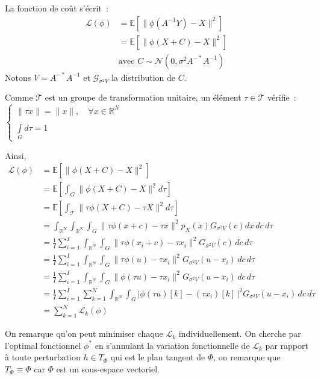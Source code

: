 \documentclass[a4paper,10pt]{article}
\theoremstyle{definition} %
\theoremstyle{definition} %
\theoremstyle{definition} %
\theoremstyle{definition} %
\newcommand{\R}{\mathbb{R}}
\begin{document}
La fonction de coût s'écrit :
\begin{align*}
    \mathcal{L}(\phi) &= \mathbb{E} \left[ \| \phi(A^{-1}Y) - X \|^2 \right]\\
    &= \mathbb{E} \left[ \| \phi(X+C) - X \|^2 \right]\\
    & \text{avec } C \sim \mathcal{N}(0,\sigma^2 A^{-*} A^{-1})
\end{align*}
Notons $V = A^{-*} A^{-1}$ et $\mathcal{G}_{\sigma^2 V}$ la distribution de $C$.

Comme $\mathcal{T}$ est un groupe de transformation unitaire, un élément $\tau \in \mathcal{T}$ vérifie :
$\begin{cases}
\|\tau x\| = \|x\|, \quad \forall x\in \R^N &\\
&\\
\int\limits_{G} d\tau = 1
\end{cases}$

Ainsi,
\begin{align*}
    \mathcal{L}(\phi) &= \mathbb{E} \left[ \| \phi(X+C) - X \|^2 \right]\\
    &= \mathbb{E} \left[\int_{G} \| \phi(X+C) - X \|^2 d \tau\right]\\
    &= \mathbb{E} \left[ \int_\mathcal{T}\| \tau\phi(X+C) - \tau X \|^2 d\tau\right]\\
    &= \int_{\R^N} \int_{\R^N} \int_{G} \| \tau\phi(x+c) - \tau x \|^2 \hat p_X(x) G_{\sigma^2 V}(c) dx\, dc\, d\tau\\
   &= \frac{1}{I}\sum\limits_{i=1}^I \int_{\R^N} \int_{G} \| \tau\phi(x_i+c) - \tau x_i \|^2  G_{\sigma^2 V}(c)\, dc\, d\tau\\
   &= \frac{1}{I}\sum\limits_{i=1}^I \int_{\R^N} \int_{G} \| \tau\phi(u) - \tau x_i \|^2  G_{\sigma^2 V}(u-x_i)\, dc\, d\tau\\
   &= \frac{1}{I}\sum\limits_{i=1}^I \int_{\R^N} \int_{G} \| \phi(\tau u) - \tau x_i \|^2  G_{\sigma^2 V}(u-x_i)\, dc\, d\tau\\
   &= \frac{1}{I}\sum\limits_{i=1}^I \sum\limits_{k=1}^N \int_{\R^N} \int_{G} \big| \phi(\tau u)[k] - (\tau x_i)[k] \,\big|^2  G_{\sigma^2 V}(u-x_i)\, dc\, d\tau\\
   &= \sum\limits_{k=1}^N \mathcal{L}_k(\phi) 
\end{align*}

On remarque qu'on peut minimiser chaque $\mathcal{L}_k$ individuellement. On cherche par l'optimal fonctionnel $\phi^*$ en s'annulant la variation fonctionnelle de $\mathcal{L}_k$ par rapport à toute perturbation $h \in T_\Phi$ qui est le plan tangent de $\Phi$, on remarque que $T_\Phi \equiv \Phi$ car $\Phi$ est un sous-espace vectoriel.
\end{document}
